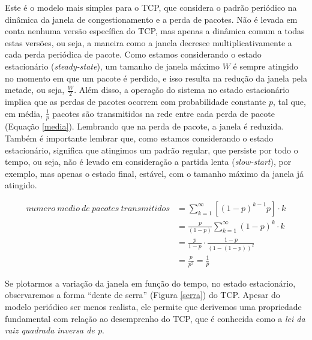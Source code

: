 

Este é o modelo mais simples para o TCP, que considera o padrão periódico na
dinâmica da janela de congestionamento e a perda de pacotes. Não é levada em
conta nenhuma versão específica do TCP, mas apenas a dinâmica comum a todas
estas versões, ou seja, a maneira como a janela decresce multiplicativamente a
cada perda periódica de pacote. Como estamos considerando o estado estacionário
(\textit{steady-state}), um tamanho de janela máximo $W$ é sempre atingido no
momento em que um pacote é perdido, e isso resulta na redução da janela pela
metade, ou seja, $\frac{W}{2}$. Além disso, a operação do sistema no estado
estacionário implica que as perdas de pacotes ocorrem com probabilidade
constante $p$, tal que, em média, $\frac{1}{p}$ pacotes são transmitidos na rede
entre cada perda de pacote (Equação \ref{media}). Lembrando que na perda de
pacote, a janela é reduzida. Também é importante lembrar que, como estamos considerando o estado
estacionário, significa que atingimos um padrão regular, que persiste por todo o
tempo, ou seja, não é levado em consideração a partida lenta
(\textit{slow-start}), por exemplo, mas apenas o estado final, estável, com o
tamanho máximo da janela já atingido.

\begin{align}
\label{media}
numero\ medio\ de\ pacotes\ transmitidos &= \sum_{k=1}^{\infty}
\left[(1-p)^{k-1}p\right] \cdot k \nonumber\\
&= \frac{p}{(1-p)} \sum_{k=1}^{\infty} (1-p)^{k} \cdot k\nonumber\\
&= \frac{p}{1-p} \cdot \frac{1-p}{\left(1-(1-p)\right)^{2}}\nonumber\\
&= \frac{p}{p^{2}} = \frac{1}{p}
\end{align}

Se plotarmos a variação da janela em função do tempo, no estado
estacionário, observaremos a forma ``dente de serra'' (Figura \ref{serra}) do
TCP. Apesar do modelo periódico ser menos realista, ele permite que derivemos uma propriedade
fundamental com relação ao desemprenho do TCP, que é conhecida como a
\textit{lei da raiz quadrada inversa de p}.

